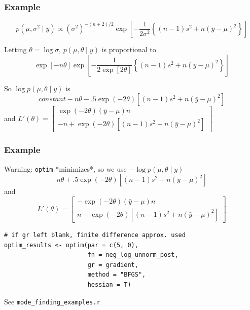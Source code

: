 \documentclass{beamer}
\begin{document}
\begin{frame}[fragile]
\frametitle{Example}

\[
p(\mu, \sigma^2 \mid y) \propto (\sigma^2)^{-(n+2)/2}\exp\left[ - \frac{1}{2\sigma^2}\left\{(n-1)  s^2 + n(\bar{y} - \mu)^2 \right\} \right]
\]

Letting $\theta = \log \sigma$, $p(\mu, \theta \mid y)$ is proportional to
\[
\exp[-n\theta]\exp\left[ - \frac{1}{2\exp[2\theta]}\left\{(n-1)  s^2 + n(\bar{y} - \mu)^2 \right\} \right] 
\]

So $\log p(\mu, \theta \mid y)$ is 
$$
constant -n\theta - .5\exp(-2\theta)\left[(n-1)  s^2 + n(\bar{y} - \mu)^2 \right]
$$
and $L'(\theta) = \left[\begin{array}{c}
\exp(-2\theta)(\bar{y}-\mu)n \\ -n + \exp(-2\theta)\left[(n-1)  s^2 + n(\bar{y} - \mu)^2 \right]
\end{array}\right]$

\end{frame}

\begin{frame}[fragile]
\frametitle{Example}

Warning: \verb|optim| *minimizes*, so we use $-\log p(\mu, \theta \mid y)$ 
$$
n\theta + .5\exp(-2\theta)\left[(n-1)  s^2 + n(\bar{y} - \mu)^2 \right]
$$
and 
$$
L'(\theta) = \left[\begin{array}{c}
-\exp(-2\theta)(\bar{y}-\mu)n \\ 
n - \exp(-2\theta)\left[(n-1)  s^2 + n(\bar{y} - \mu)^2 \right]
\end{array}\right]
$$

\begin{verbatim}
# if gr left blank, finite difference approx. used
optim_results <- optim(par = c(5, 0), 
                       fn = neg_log_unnorm_post, 
                       gr = gradient, 
                       method = "BFGS", 
                       hessian = T)
\end{verbatim}
See \verb|mode_finding_examples.r|

\end{frame}
\end{document}

